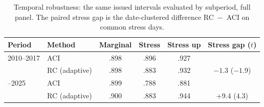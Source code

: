 \begin{table}[t]
\centering
\caption{Temporal robustness: the same issued intervals evaluated
by subperiod, full panel. The paired stress gap is the date-clustered
difference RC~$-$~ACI on common stress days.}
\label{tab:temporal}
\small
\begin{tabular}{llcccc}
\toprule
Period & Method & Marginal & Stress & Stress up & Stress gap ($t$) \\
\midrule
2010--2017 & ACI & .898 & .896 & .927 & \\
 & RC (adaptive) & .898 & .883 & .932 & $-1.3$ ($-1.9$) \\
\addlinespace
2018--2025 & ACI & .899 & .788 & .881 & \\
 & RC (adaptive) & .900 & .883 & .944 & $+9.4$ ($4.3$) \\
\bottomrule
\end{tabular}
\end{table}
